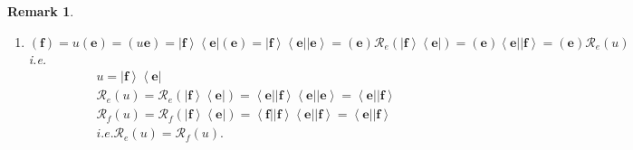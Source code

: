 \documentclass[aps,preprint]{revtex4}%
\newtheorem{remark}[theorem]{Remark}
\begin{document}
\begin{remark}
\begin{enumerate}
\begin{enumerate}
\item
\begin{equation}
\left(  \mathbf{f}\right)  =u\left(  \mathbf{e}\right)  =\left(
u\mathbf{e}\right)  =\left\vert \mathbf{f}\right\rangle \left\langle
\mathbf{e}\right\vert \left(  \mathbf{e}\right)  =\left\vert \mathbf{f}%
\right\rangle \left\langle \mathbf{e}\right\vert \left\vert \mathbf{e}%
\right\rangle =\left(  \mathbf{e}\right)  \mathcal{R}_{e}\left(  \left\vert
\mathbf{f}\right\rangle \left\langle \mathbf{e}\right\vert \right)  =\left(
\mathbf{e}\right)  \left\langle \mathbf{e}\right\vert \left\vert
\mathbf{f}\right\rangle =\left(  \mathbf{e}\right)  \mathcal{R}_{e}\left(
u\right)
\end{equation}
i.e.%
\begin{gather}
u=\left\vert \mathbf{f}\right\rangle \left\langle \mathbf{e}\right\vert \\
\mathcal{R}_{e}\left(  u\right)  =\mathcal{R}_{e}\left(  \left\vert
\mathbf{f}\right\rangle \left\langle \mathbf{e}\right\vert \right)
=\left\langle \mathbf{e}\right\vert \left\vert \mathbf{f}\right\rangle
\left\langle \mathbf{e}\right\vert \left\vert \mathbf{e}\right\rangle
=\left\langle \mathbf{e}\right\vert \left\vert \mathbf{f}\right\rangle \\
\mathcal{R}_{f}\left(  u\right)  =\mathcal{R}_{f}\left(  \left\vert
\mathbf{f}\right\rangle \left\langle \mathbf{e}\right\vert \right)
=\left\langle \mathbf{f}\right\vert \left\vert \mathbf{f}\right\rangle
\left\langle \mathbf{e}\right\vert \left\vert \mathbf{f}\right\rangle
=\left\langle \mathbf{e}\right\vert \left\vert \mathbf{f}\right\rangle \\
i.e.\mathcal{R}_{e}\left(  u\right)  =\mathcal{R}_{f}\left(  u\right)  .
\end{gather}



\end{enumerate}
\end{enumerate}
\end{remark}
\end{document}
